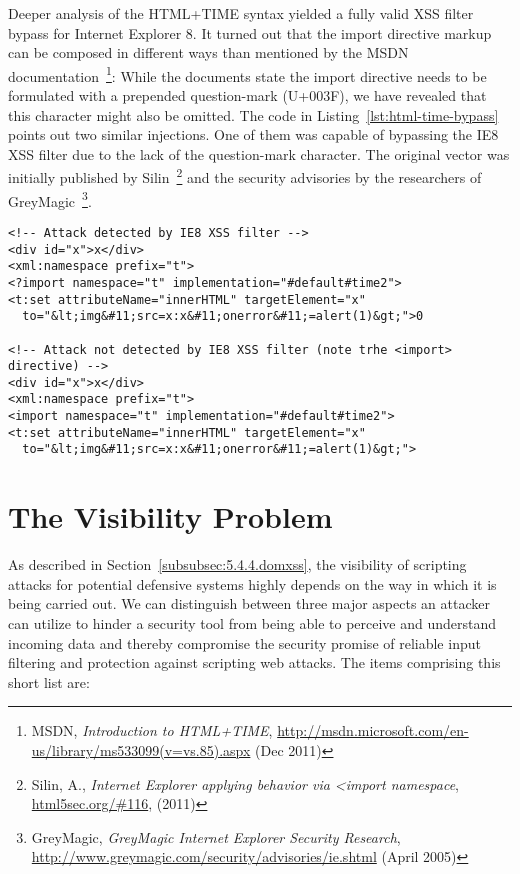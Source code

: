   Deeper analysis of the HTML+TIME syntax yielded a fully valid XSS filter bypass for Internet Explorer 8. It turned out that the import directive markup can be composed in different ways than mentioned by the MSDN documentation~\footnote{MSDN, \textit{Introduction to HTML+TIME}, \url{http://msdn.microsoft.com/en-us/library/ms533099(v=vs.85).aspx} (Dec 2011)}: While the documents state the import directive needs to be formulated with a prepended question-mark (U+003F), we have revealed that this character might also be omitted. The code in Listing~\ref{lst:html-time-bypass} points out two similar injections. One of them was capable of bypassing the IE8 XSS filter due to the lack of the question-mark character. The original vector was initially published by Silin~\footnote{Silin, A., \textit{Internet Explorer applying behavior via <import namespace}, \url{html5sec.org/#116}, (2011)} and the security advisories by the researchers of GreyMagic~\footnote{GreyMagic, \textit{GreyMagic Internet Explorer Security 
Research}, \url{http://www.greymagic.com/security/advisories/ie.shtml} (April 2005)}.\\

\begin{lstlisting}[captionpos=b,label=lst:html-time-bypass,caption=Bypassing the IE8 XSS filter via HTML+TIME import directives; explanations are visible inline]
<!-- Attack detected by IE8 XSS filter -->
<div id="x">x</div>
<xml:namespace prefix="t">
<?import namespace="t" implementation="#default#time2">
<t:set attributeName="innerHTML" targetElement="x" 
  to="&lt;img&#11;src=x:x&#11;onerror&#11;=alert(1)&gt;">0

<!-- Attack not detected by IE8 XSS filter (note trhe <import> directive) -->
<div id="x">x</div>
<xml:namespace prefix="t">
<import namespace="t" implementation="#default#time2">
<t:set attributeName="innerHTML" targetElement="x" 
  to="&lt;img&#11;src=x:x&#11;onerror&#11;=alert(1)&gt;">
\end{lstlisting}

  \section{The Visibility Problem}
  \label{subsec:5.5.the_visibility_problem}

  As described in Section~\ref{subsubsec:5.4.4.domxss}, the visibility of scripting attacks for potential defensive systems highly depends on the way in which it is being carried out. We can distinguish between three major aspects an attacker can utilize to hinder a security tool from being able to perceive and understand incoming data and thereby compromise the security promise of reliable input filtering and protection against scripting web attacks. The items comprising this short list are: 

